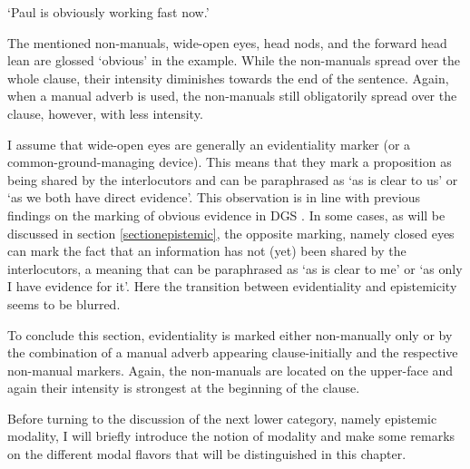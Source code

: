 \begin{exe}
\ex\label{ex:obiousness}  
\glt `Paul is obviously working fast now.'
\end{exe}

\noindent The mentioned non-manuals, wide-open eyes, head nods, and the forward head lean are glossed `obvious' in the example. While the non-manuals spread over the whole clause, their intensity diminishes towards the end of the sentence. Again, when a manual adverb is used, the non-manuals still obligatorily spread over the clause, however, with less intensity.


I assume that wide-open eyes are generally an evidentiality marker (or a common-ground-managing device). This means that they mark a proposition as being shared by the interlocutors and can be paraphrased as `as is clear to us' or `as we both have direct evidence'.\label{obviousness} This observation is in line with previous findings on the marking of obvious evidence in DGS \citep[133]{herrmann2013modal}. In some cases, as will be discussed in section \ref{sectionepistemic}, the opposite marking, namely closed eyes can mark the fact that an information has not (yet) been shared by the interlocutors, a meaning that can be paraphrased as `as is clear to me' or `as only I have evidence for it'. Here the transition between evidentiality and epistemicity seems to be blurred.

To conclude this section, evidentiality is marked either non-manually only or by the combination of a manual adverb appearing clause-initially and the respective non-manual markers. Again, the non-manuals are located on the upper-face and again their intensity is strongest at the beginning of the clause.

Before turning to the discussion of the next lower category, namely epistemic modality, I will briefly introduce the notion of modality and make some remarks on the different modal flavors that will be distinguished in this chapter.

